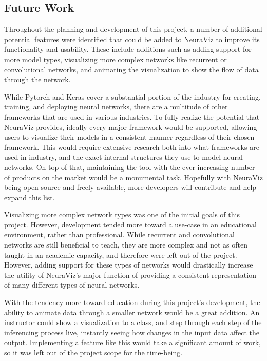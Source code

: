 \subsection{Future Work}
Throughout the planning and development of this project, a number of additional potential features were identified that could be added to NeuraViz to improve its functionality and usability. These include additions such as adding support for more model types, visualizing more complex networks like recurrent or convolutional networks, and animating the visualization to show the flow of data through the network.

While Pytorch and Keras cover a substantial portion of the industry for creating, training, and deploying neural networks, there are a multitude of other frameworks that are used in various industries. To fully realize the potential that NeuraViz provides, ideally every major framework would be supported, allowing users to visualize their models in a consistent manner regardless of their chosen framework. This would require extensive research both into what frameworks are used in industry, and the exact internal structures they use to model neural networks. On top of that, maintaining the tool with the ever-increasing number of products on the market would be a monumental task. Hopefully with NeuraViz being open source and freely available, more developers will contribute and help expand this list. 

Visualizing more complex network types was one of the initial goals of this project. However, development tended more toward a use-case in an educational environment, rather than professional. While recurrent and convolutional networks are still beneficial to teach, they are more complex and not as often taught in an academic capacity, and therefore were left out of the project. However, adding support for these types of networks would drastically increase the utility of NeuraViz's major function of providing a consistent representation of many different types of neural networks. 

With the tendency more toward education during this project's development, the ability to animate data through a smaller network would be a great addition. An instructor could show a visualization to a class, and step through each step of the inferencing process live, instantly seeing how changes in the input data affect the output. Implementing a feature like this would take a significant amount of work, so it was left out of the project scope for the time-being.